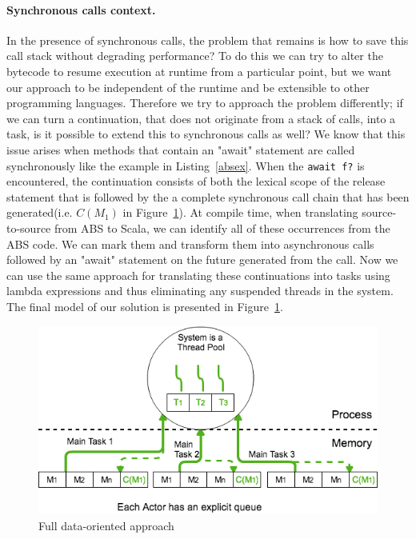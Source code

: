  

\paragraph{Synchronous calls context.}

In the presence of synchronous calls, the problem that remains is how to save this call stack without degrading performance? To do this we can try to alter the bytecode to resume execution at runtime from a particular point, but we want our approach to be independent of the runtime and be extensible to other programming languages. Therefore we try to approach the problem differently; if we can turn a continuation, that does not originate from a stack of calls, into a task, is it possible to extend this to synchronous calls as well? We know that this issue arises when methods that contain an "await" statement are called synchronously like the example in Listing~\ref{absex}. When the \texttt{await f?} is encountered,  the continuation consists of both the lexical scope of the release statement that is followed by the a complete synchronous call chain that has been generated(i.e. $C(M_1)$ in Figure~\ref{sol}). At compile time, when translating source-to-source from ABS to Scala, we can identify all of these occurrences from the ABS code. We can mark them and transform them into asynchronous calls followed by an "await" statement on the future generated from the call. Now we can use the same approach for translating these continuations into tasks using lambda expressions and thus eliminating any suspended threads in the system.  The final model of our solution is presented in Figure~\ref{sol}. 
\begin{figure}
	\centering
	\includegraphics[scale=0.45]{solution.png}
	\caption{Full data-oriented approach}
	\label{sol}
\end{figure}

